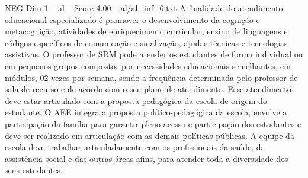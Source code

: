 \begin{textsample}{NEG Dim 1 – al – Score 4.00 – al/al\_inf\_6.txt}
A finalidade do atendimento educacional especializado é promover o desenvolvimento da cognição e metacognição, atividades de enriquecimento curricular, ensino de linguagens e códigos específicos de comunicação e sinalização, ajudas técnicas e tecnologias assistivas.
O professor de SRM pode atender os estudantes de forma individual ou em pequenos grupos compostos por necessidades educacionais semelhantes, em módulos, 02 vezes por semana, sendo a frequência determinada pelo professor de sala de recurso e de acordo com o seu plano de atendimento.
Esse atendimento deve estar articulado com a proposta pedagógica da escola de origem do estudante.
O AEE integra a proposta político-pedagógica da escola, envolve a participação da família para garantir pleno acesso e participação dos estudantes e deve ser realizado em articulação com as demais políticas públicas.
A equipe da escola deve trabalhar articuladamente com os profissionais da saúde, da assistência social e das outras áreas afins, para atender toda a diversidade dos seus estudantes.

\end{textsample}
